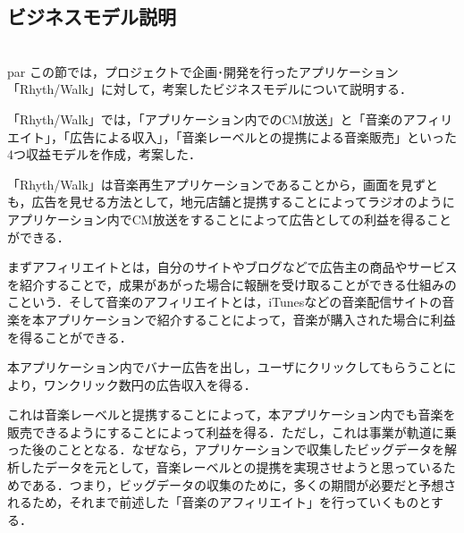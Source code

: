 \subsection{ビジネスモデル説明}
\\par
この節では，プロジェクトで企画･開発を行ったアプリケーション「Rhyth/Walk」に対して，考案したビジネスモデルについて説明する．
\par
「Rhyth/Walk」では，「アプリケーション内でのCM放送」と「音楽のアフィリエイト」，「広告による収入」，「音楽レーベルとの提携による音楽販売」といった4つ収益モデルを作成，考案した．
\par
\begin{itemize}
「Rhyth/Walk」は音楽再生アプリケーションであることから，画面を見ずとも，広告を見せる方法として，地元店舗と提携することによってラジオのようにアプリケーション内でCM放送をすることによって広告としての利益を得ることができる．
\par
{}
まずアフィリエイトとは，自分のサイトやブログなどで広告主の商品やサービスを紹介することで，成果があがった場合に報酬を受け取ることができる仕組みのこという．そして音楽のアフィリエイトとは，iTunesなどの音楽配信サイトの音楽を本アプリケーションで紹介することによって，音楽が購入された場合に利益を得ることができる．
\par
{}
本アプリケーション内でバナー広告を出し，ユーザにクリックしてもらうことにより，ワンクリック数円の広告収入を得る．
\par
{}
これは音楽レーベルと提携することによって，本アプリケーション内でも音楽を販売できるようにすることによって利益を得る．ただし，これは事業が軌道に乗った後のこととなる．なぜなら，アプリケーションで収集したビッグデータを解析したデータを元として，音楽レーベルとの提携を実現させようと思っているためである．つまり，ビッグデータの収集のために，多くの期間が必要だと予想されるため，それまで前述した「音楽のアフィリエイト」を行っていくものとする．
\end{itemize}
